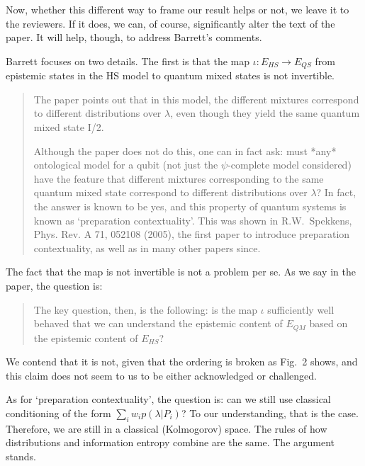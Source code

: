 \documentclass[11pt]{article}
\begin{document}
	Now, whether this different way to frame our result helps or not, we leave it to the reviewers. If it does, we can, of course, significantly alter the text of the paper. It will help, though, to address Barrett's comments.

	Barrett focuses on two details. The first is that the map $\iota : E_{HS} \to E_{QS}$ from epistemic states in the HS model to quantum mixed states is not invertible. 
	\begin{quote}
The paper points out that in this model, the different mixtures correspond to different distributions over $\lambda$, even though they yield the same quantum mixed state I/2.

Although the paper does not do this, one can in fact ask: must *any* ontological model for a qubit (not just the $\psi$-complete model considered) have the feature that different mixtures corresponding to the same quantum mixed state correspond to different distributions over $\lambda$? In fact, the answer is known to be yes, and this property of quantum systems is known as `preparation contextuality’. This was shown in R.W.\ Spekkens, Phys. Rev. A 71, 052108 (2005), the first paper to introduce preparation contextuality, as well as in many other papers since.
	\end{quote}

	The fact that the map is not invertible is not a problem per se. As we say in the paper, the question is:
	\begin{quote}
The key question, then, is the following: is the
map $\iota$ sufficiently well behaved that we can understand
the epistemic content of $E_{QM}$ based on the epistemic
content of $E_{HS}$?
	\end{quote}
We contend that it is not, given that the ordering is broken as Fig.~2 shows, and this claim does not seem to us to be either acknowledged or challenged.

As for `preparation contextuality', the question is: can we still use classical conditioning of the form $\sum_i  w_i p(\lambda| P_i)$? To our understanding, that is the case. Therefore, we are still in a classical (Kolmogorov) space. The rules of how distributions and information entropy combine are the same. The argument stands.
\end{document}

